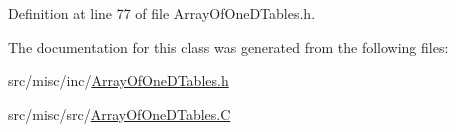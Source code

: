 Definition at line 77 of file Array\-Of\-One\-D\-Tables.\-h.



The documentation for this class was generated from the following files\-:\begin{DoxyCompactItemize}
\item 
src/misc/inc/\hyperlink{_array_of_one_d_tables_8h}{Array\-Of\-One\-D\-Tables.\-h}\item 
src/misc/src/\hyperlink{_array_of_one_d_tables_8_c}{Array\-Of\-One\-D\-Tables.\-C}\end{DoxyCompactItemize}
